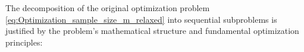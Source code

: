 




The decomposition of the original optimization problem \eqref{eq:Optimization_sample_size_m_relaxed} into sequential subproblems is justified by the problem's mathematical structure and fundamental optimization principles:


